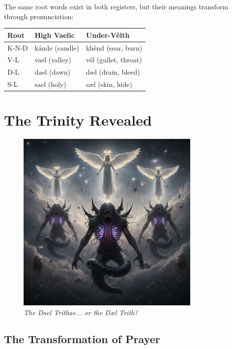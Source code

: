 \documentclass[11pt,a4paper,twoside]{book}
\begin{document}
\begin{tcolorbox}[codexbox={Linguistic Observation}]
The same root words exist in both registers, but their meanings transform through pronunciation:

\begin{tabular}{lll}
\textbf{Root} & \textbf{High Vaelic} & \textbf{Under-Vêlth} \\
\hline
K-N-D & kánde (candle) & khênd (sear, burn) \\
V-L & vael (valley) & vêl (gullet, throat) \\
D-L & dael (dawn) & dæl (drain, bleed) \\
S-L & sael (holy) & sæl (skin, hide) \\
\end{tabular}
\end{tcolorbox}

\section{The Trinity Revealed}

\begin{figure}[h]
\centering
\includegraphics[width=0.8\textwidth]{images/dael_trithae_horror_2025-09-03T22-22-42-860Z_1.png}
\caption*{\textit{The Dael Tríthae... or the Dæl Trith?}}
\end{figure}

\subsection{The Transformation of Prayer}
\end{document}
